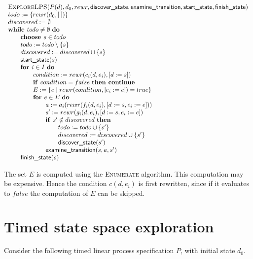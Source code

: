 \documentclass{article}
\newcommand{\Space}{\text{\ }}
\newcommand{\If}{\text{\textbf{if }}}
\newcommand{\Do}{\text{\textbf{do }}}
\newcommand{\Then}{\text{\textbf{then }}}
\newcommand{\For}{\text{\textbf{for }}}
\newcommand{\While}{\text{\textbf{while }}}
\newcommand{\Continue}{\text{\textbf{continue }}}
\newcommand{\Choose}{\text{\textbf{choose }}}
\begin{document}
\[
\begin{tabular}{l}
\textsc{ExploreLPS}($P(d), d_0, rewr, \textsf{discover\_state}, \textsf{examine\_transition},
\textsf{start\_state}, \textsf{finish\_state})$ \\
$todo := \{rewr(d_0, [\:])\}$ \\
$discovered := \emptyset$ \\
$\While todo \neq \emptyset \Space \Do$ \\
\qquad \Choose $s \in todo$ \\
\qquad $todo := todo \setminus \{s\}$ \\
\qquad $discovered := discovered \cup \{s\}$ \\
\qquad $\textsf{start\_state}(s)$ \\
\qquad $\For i \in I  \Space \Do$ \\
\qquad \qquad $condition := rewr(c_i(d, e_i), [d := s])$ \\
\qquad \qquad $\If condition = false  \Space \Then \Continue$ \\
\qquad \qquad $E := \{ e \mid rewr(condition, [e_i := e]) = true \}$ \\
\qquad \qquad $\For e \in E  \Space \Do$ \\
\qquad \qquad \qquad $a := a_i(rewr(f_i(d,e_i), [d:=s,e_i:=e]))$ \\
\qquad \qquad \qquad $s' := rewr(g_i(d,e_i), [d:=s,e_i:=e])$ \\
\qquad \qquad \qquad $\If s' \notin discovered \Space \Then$ \\
\qquad \qquad \qquad \qquad $todo := todo \cup \{ s' \}$ \\
\qquad \qquad \qquad \qquad $discovered := discovered \cup \{s'\}$ \\
\qquad \qquad \qquad \qquad $\textsf{discover\_state}(s')$ \\
\qquad \qquad \qquad $\textsf{examine\_transition}(s, a, s')$ \\
\qquad $\textsf{finish\_state}(s)$ \\
\end{tabular}
\]

The set $E$ is computed using the \textsc{Enumerate} algorithm. This computation may be expensive. Hence the condition $c(d,e_i)$ is first rewritten, since if it evaluates to $false$ the computation of $E$ can be skipped.

\section{Timed state space exploration}
Consider the following timed linear process specification $P$, with initial state $d_0$.
\end{document}
